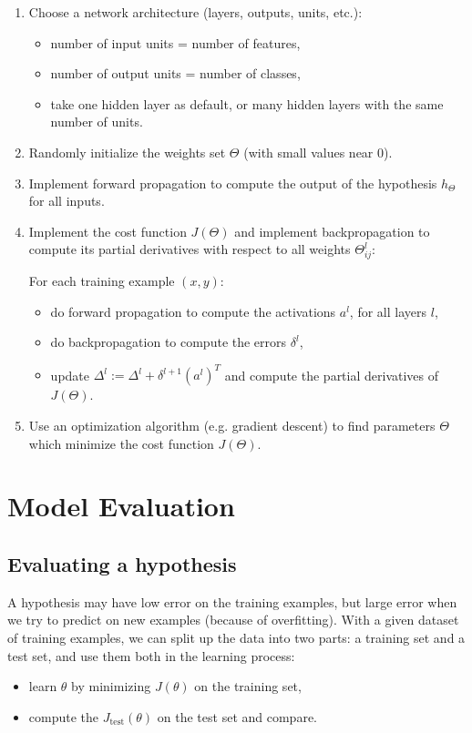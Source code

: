 \documentclass[a4paper,11pt]{report}
\begin{document}
\begin{enumerate}
  \item Choose a network architecture (layers, outputs, units, etc.):
    \begin{itemize}
      \item number of input units = number of features,
      \item number of output units = number of classes,
      \item take one hidden layer as default, or many hidden layers with the same number of units.
    \end{itemize}

  \item Randomly initialize the weights set $\Theta$ (with small values near 0).

  \item Implement forward propagation to compute the output of the hypothesis $h_\Theta$ for all inputs.

  \item Implement the cost function $J(\Theta)$ and implement backpropagation to compute its partial derivatives with respect to all weights $\Theta^l_{ij}$:

    For each training example $(x, y)$:
    \begin{itemize}
      \item do forward propagation to compute the activations $a^l$, for all layers $l$,
      \item do backpropagation to compute the errors $\delta^l$,
      \item update $\Delta^l := \Delta^l + \delta^{l+1}(a^l)^T$ and compute the partial derivatives of $J(\Theta)$.
    \end{itemize}

  \item Use an optimization algorithm (e.g. gradient descent) to find parameters $\Theta$ which minimize the cost function $J(\Theta)$.
\end{enumerate}


\chapter{Model Evaluation}

\section{Evaluating a hypothesis}

A hypothesis may have low error on the training examples, but large error when we try to predict on new examples (because of overfitting). With a given dataset of training examples, we can split up the data into two parts: a training set and a test set, and use them both in the learning process:
\begin{itemize}
\item learn $\theta$ by minimizing $J(\theta)$ on the training set,
\item compute the $J_{\mathrm{test}}(\theta)$ on the test set and compare.
\end{itemize}
\end{document}
